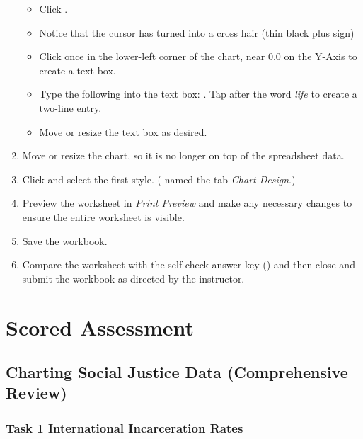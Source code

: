 \begin{enumbox}
\begin{enumerate}
		\begin{itemize}
			\item Click .
			\item Notice that the cursor has turned into a cross hair (thin black plus sign)
			\item Click once in the lower-left corner of the chart, near $ 0.0 $ on the Y-Axis to create a text box.
			\item Type the following into the text box: . Tap  after the word \textit{life} to create a two-line entry. 
			\item Move or resize the text box as desired.
		\end{itemize}
		
		\item Move or resize the chart, so it is no longer on top of the spreadsheet data.
		\item Click  and select the first style. ( named the tab \textit{Chart Design}.)
		\item Preview the  worksheet in \textit{Print Preview} and make any necessary changes to ensure the entire worksheet is visible.
		\item Save the  workbook.
		\item Compare the worksheet with the self-check answer key () and then close and submit the  workbook as directed by the instructor.
		
	\end{enumerate}
\end{enumbox}
	
\section{Scored Assessment}

\subsection{Charting Social Justice Data (Comprehensive Review)}

\subsubsection{Task 1 International Incarceration Rates}


